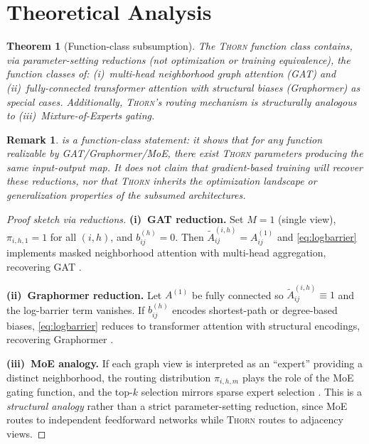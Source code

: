 \documentclass[11pt,a4paper]{article}
\newtheorem{theorem}{Theorem}
\newtheorem{remark}{Remark}
\newcommand{\thorn}{\textsc{Thorn}}
\begin{document}
\section{Theoretical Analysis}
\label{sec:theory}

\begin{theorem}[Function-class subsumption]
  \label{thm:subsumption}
  The \thorn{} function class contains, via parameter-setting reductions
  (not optimization or training equivalence), the function classes of:
  (i)~multi-head neighborhood graph attention (GAT) and
  (ii)~fully-connected transformer attention with structural biases
  (Graphormer)
  as special cases.
  Additionally, \thorn{}'s routing mechanism is structurally analogous
  to (iii)~Mixture-of-Experts gating.
\end{theorem}

\begin{remark}
   is a \emph{function-class} statement: it shows
  that for any function realizable by GAT/Graphormer/MoE, there exist
  \thorn{} parameters producing the same input-output map.
  It does \emph{not} claim that gradient-based training will recover
  these reductions, nor that \thorn{} inherits the optimization
  landscape or generalization properties of the subsumed architectures.
\end{remark}

\begin{proof}[Proof sketch via reductions]
  \textbf{(i)~GAT reduction.}
  Set $M = 1$ (single view), $\pi_{i,h,1} = 1$ for all $(i, h)$, and
  $b_{ij}^{(h)} = 0$.
  Then $\tilde{A}_{ij}^{(i,h)} = A_{ij}^{(1)}$ and
  \eqref{eq:logbarrier} implements masked neighborhood attention with
  multi-head aggregation, recovering GAT \citep{velickovic2018graph}.

  \textbf{(ii)~Graphormer reduction.}
  Let $A^{(1)}$ be fully connected so
  $\tilde{A}_{ij}^{(i,h)} \equiv 1$ and the log-barrier term vanishes.
  If $b_{ij}^{(h)}$ encodes shortest-path or degree-based biases,
  \eqref{eq:logbarrier} reduces to transformer attention with structural
  encodings, recovering Graphormer \citep{ying2021transformers}.

  \textbf{(iii)~MoE analogy.}
  If each graph view is interpreted as an ``expert'' providing a
  distinct neighborhood, the routing distribution $\pi_{i,h,m}$ plays
  the role of the MoE gating function, and the top-$k$ selection
  mirrors sparse expert selection \citep{shazeer2017outrageously}.
  This is a \emph{structural analogy} rather than a strict
  parameter-setting reduction, since MoE routes to independent
  feedforward networks while \thorn{} routes to adjacency views.
\end{proof}
\end{document}
